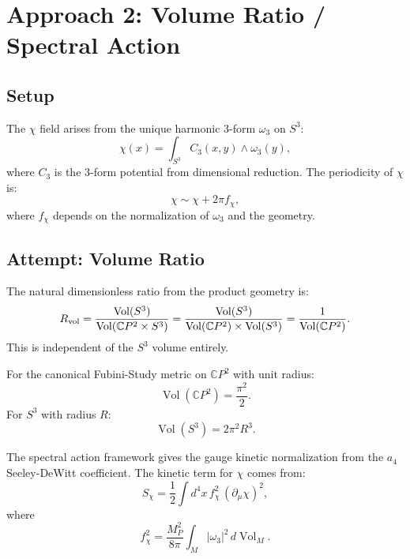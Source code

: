 \documentclass[11pt]{article}
\theoremstyle{definition}
\theoremstyle{remark}
\newcommand{\CP}{\mathbb{C}P}
\newcommand{\Vol}{\operatorname{Vol}}
\begin{document}
\section{Approach 2: Volume Ratio / Spectral Action}
\label{sec:volume}

\subsection{Setup}

The $\chi$ field arises from the unique harmonic 3-form $\omega_3$ on $S^3$:
\begin{equation}
\chi(x) = \int_{S^3} C_3(x, y) \wedge \omega_3(y),
\end{equation}
where $C_3$ is the 3-form potential from dimensional reduction. The periodicity
of $\chi$ is:
\begin{equation}
\chi \sim \chi + 2\pi f_\chi,
\end{equation}
where $f_\chi$ depends on the normalization of $\omega_3$ and the geometry.

\subsection{Attempt: Volume Ratio}

The natural dimensionless ratio from the product geometry is:
\begin{equation}
R_{\rm vol} = \frac{\Vol(S^3)}{\Vol(\CP^2 \times S^3)} = \frac{\Vol(S^3)}{\Vol(\CP^2) \times \Vol(S^3)} = \frac{1}{\Vol(\CP^2)}.
\end{equation}
This is independent of the $S^3$ volume entirely.

For the canonical Fubini-Study metric on $\CP^2$ with unit radius:
\begin{equation}
\Vol(\CP^2) = \frac{\pi^2}{2}.
\end{equation}
For $S^3$ with radius $R$:
\begin{equation}
\Vol(S^3) = 2\pi^2 R^3.
\end{equation}

The spectral action framework gives the gauge kinetic normalization from the $a_4$
Seeley-DeWitt coefficient. The kinetic term for $\chi$ comes from:
\begin{equation}
S_\chi = \frac{1}{2} \int d^4x\, f_\chi^2\, (\partial_\mu \chi)^2,
\end{equation}
where
\begin{equation}
f_\chi^2 = \frac{M_P^2}{8\pi} \int_M |\omega_3|^2\, d\Vol_M.
\end{equation}
\end{document}
